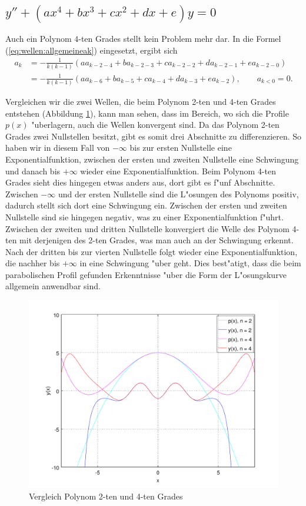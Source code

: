 \subsection{\texorpdfstring{$y''+(ax^4+bx^3+cx^2+dx+e)y = 
0$}{y''-(ax4+bx3+cx2+dx+e)y = 0}}

Auch ein Polynom $4$-ten Grades stellt kein Problem mehr dar. In die 
Formel (\ref{eq:wellen:allgemeineak}) eingesetzt, ergibt sich
\begin{equation*}
	\begin{split}
		a_k &= -\frac{1}{k(k-1)} (aa_{k-2-4} + 
		ba_{k-2-3} + ca_{k-2-2} + da_{k-2-1} +ea_{k-2-0})
		\\
		&= -\frac{1}{k(k-1)} (aa_{k-6} + ba_{k-5} + 
		ca_{k-4} + da_{k-3} +ea_{k-2}), \qquad a_{k<0} = 0.
	\end{split}
\end{equation*}

Vergleichen wir die zwei Wellen, die beim Polynom 2-ten und 4-ten Grades 
entstehen (Abbildung \ref{fig:wellen:poly4-dgl}), kann man sehen, 
dass im Bereich, wo sich die Profile $p(x)$ "uberlagern, auch die Wellen 
konvergent sind. Da das Polynom 2-ten Grades zwei Nullstellen besitzt, gibt es 
somit drei Abschnitte zu differenzieren. So haben wir in diesem Fall von 
$-\infty$ bis zur ersten Nullstelle eine Exponentialfunktion, zwischen der 
ersten und zweiten Nullstelle eine Schwingung und danach bis $+\infty$ wieder 
eine Exponentialfunktion. Beim Polynom 4-ten Grades sieht dies hingegen etwas 
anders aus, dort gibt es f"unf Abschnitte. Zwischen $-\infty$ und der ersten 
Nullstelle sind die L"osungen des Polynoms positiv, dadurch stellt sich dort 
eine Schwingung ein. Zwischen der ersten und zweiten Nullstelle sind sie 
hingegen negativ, was zu einer Exponentialfunktion f"uhrt. Zwischen der zweiten 
und dritten Nullstelle konvergiert die Welle des Polynom 4-ten mit derjenigen 
des 2-ten Grades, was man auch an der Schwingung erkennt. Nach der dritten bis 
zur vierten Nullstelle folgt wieder eine Exponentialfunktion, die nachher bis 
$+\infty$ in eine Schwingung "uber geht. Dies best"atigt, dass die beim 
parabolischen Profil gefunden Erkenntnisse "uber die Form der L"osungskurve 
allgemein anwendbar sind.

\begin{figure}
	\includegraphics[width=1\hsize]{./wellen/images/allgemein/n4.pdf}
	\caption{Vergleich Polynom 2-ten und 4-ten Grades}
	\label{fig:wellen:poly4-dgl}
\end{figure}
